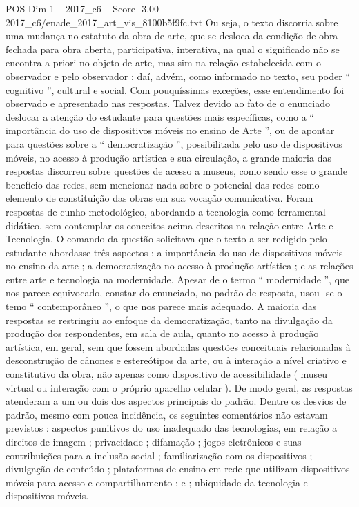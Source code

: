 \begin{textsample}{POS Dim 1 – 2017\_c6 – Score -3.00 – 2017\_c6/enade\_2017\_art\_vis\_8100b5f9fc.txt}
Ou seja, o texto discorria sobre uma mudança no estatuto da obra de arte, que se desloca da condição de obra fechada para obra aberta, participativa, interativa, na qual o significado não se encontra a priori no objeto de arte, mas sim na relação estabelecida com o observador e pelo observador ; daí, advém, como informado no texto, seu poder “ cognitivo ”, cultural e social.
Com pouquíssimas exceções, esse entendimento foi observado e apresentado nas respostas.
Talvez devido ao fato de o enunciado deslocar a atenção do estudante para questões mais específicas, como a “ importância do uso de dispositivos móveis no ensino de Arte ”, ou de apontar para questões sobre a “ democratização ”, possibilitada pelo uso de dispositivos móveis, no acesso à produção artística e sua circulação, a grande maioria das respostas discorreu sobre questões de acesso a museus, como sendo esse o grande benefício das redes, sem mencionar nada sobre o potencial das redes como elemento de constituição das obras em sua vocação comunicativa.
Foram respostas de cunho metodológico, abordando a tecnologia como ferramental didático, sem contemplar os conceitos acima descritos na relação entre Arte e Tecnologia.
O comando da questão solicitava que o texto a ser redigido pelo estudante abordasse três aspectos : a importância do uso de dispositivos móveis no ensino da arte ; a democratização no acesso à produção artística ; e as relações entre arte e tecnologia na modernidade.
Apesar de o termo “ modernidade ”, que nos parece equivocado, constar do enunciado, no padrão de resposta, usou -se o temo “ contemporâneo ”, o que nos parece mais adequado.
A maioria das respostas se restringiu ao enfoque da democratização, tanto na divulgação da produção dos respondentes, em sala de aula, quanto no acesso à produção artística, em geral, sem que fossem abordadas questões conceituais relacionadas à desconstrução de cânones e estereótipos da arte, ou à interação a nível criativo e constitutivo da obra, não apenas como dispositivo de acessibilidade ( museu virtual ou interação com o próprio aparelho celular ).
De modo geral, as respostas atenderam a um ou dois dos aspectos principais do padrão.
Dentre os desvios de padrão, mesmo com pouca incidência, os seguintes comentários não estavam previstos : aspectos punitivos do uso inadequado das tecnologias, em relação a direitos de imagem ; privacidade ; difamação ; jogos eletrônicos e suas contribuições para a inclusão social ; familiarização com os dispositivos ; divulgação de conteúdo ; plataformas de ensino em rede que utilizam dispositivos móveis para acesso e compartilhamento ; e ; ubiquidade da tecnologia e dispositivos móveis.

\end{textsample}
